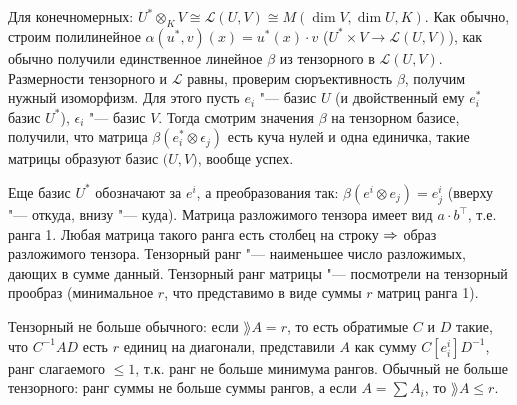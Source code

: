 \section{} %
Для конечномерных: $U^* \otimes_K V \cong \mathcal L(U, V) \cong M(\dim V, \dim U, K)$.
Как обычно, строим полилинейное $\alpha(u^*, v)(x) = u^*(x) \cdot v$ ($U^* \times V \to \mathcal L(U, V)$), как обычно получили единственное
линейное $\beta$ из тензорного в $\mathcal L (U, V)$.
Размерности тензорного и $\mathcal L$ равны, проверим сюръективность $\beta$, получим нужный изоморфизм.
Для этого пусть $e_i$ "--- базис $U$ (и двойственный ему $e_i^*$ базис $U^*$), $\epsilon_i$ "--- базис $V$.
Тогда смотрим значения $\beta$ на тензорном базисе, получили, что матрица $\beta(e_i^*\otimes \epsilon_j)$ есть куча нулей и одна единичка,
такие матрицы образуют базис $\mathcal (U, V)$, вообще успех.

Еще базис $U^*$ обозначают за $e^i$, а преобразования так: $\beta(e^i\otimes e_j)=e^i_j$ (вверху "--- откуда, внизу "--- куда).
Матрица разложимого тензора имеет вид $a\cdot b^\top$, т.е. ранга 1.
Любая матрица такого ранга есть столбец на строку $\Rightarrow$ образ разложимого тензора.
Тензорный ранг "--- наименьшее число разложимых, дающих в сумме данный.
Тензорный ранг матрицы "--- посмотрели на тензорный прообраз (минимальное $r$, что представимо в виде
суммы $r$ матриц ранга 1).

Тензорный не больше обычного: если $\rang A = r$, то есть обратимые $C$ и $D$ такие, что $C^{-1}AD$ есть $r$ единиц на диагонали,
представили $A$ как сумму $C[e^i_i]D^{-1}$, ранг слагаемого $\le 1$, т.к. ранг не больше минимума рангов.
Обычный не больше тензорного: ранг суммы не больше суммы рангов, а если $A=\sum A_i$, то $\rang A \le r$.

\section{} %

\section{} %

\section{} %

\section{} %

\section{} %

\section{} %
